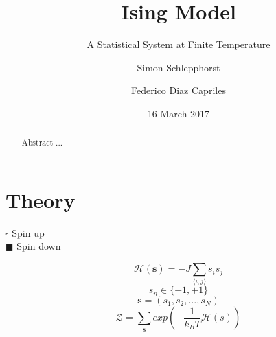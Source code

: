 \documentclass[a4]{scrartcl}
\begin{document}
\author{Simon Schlepphorst \and Federico Diaz Capriles}
\title{Ising Model}
\subtitle{A Statistical System at Finite Temperature}
\date{16 March 2017}

\maketitle

\begin{abstract}
Abstract ...
\end{abstract}

\tableofcontents

\section{Theory}

	\begin{minipage}{.6\textwidth}
			\begin{center}
		\end{center}
	\end{minipage}%
	\begin{minipage}[]{.4\textwidth}
		$ \square $ Spin up \\ 
		$ \blacksquare $ Spin down 
	\end{minipage}
	\vspace{-.05cm}
	\begin{equation}
		 \mathcal{H}(\textbf{s}) = -J \sum_{\langle i, j \rangle} s_{i} s_{j}
	\end{equation}
	{\scriptsize \begin{equation*}
		 s_{n} \in \{-1,+1\}
	\end{equation*}}\vspace{-.5cm}
	\begin{equation}
		\textbf{s} = (s_{1}, s_{2}, \dots, s_{N})
	\end{equation}
	\begin{equation}
		\mathcal{Z} = \sum_{\textbf{s}} exp(-\frac{1}{k_{B} T}\mathcal{H}(s))
	\end{equation}
	
\end{document}
